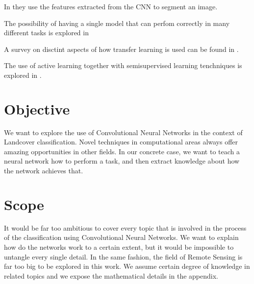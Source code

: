 In \cite{DBLP:journals/corr/LongSD14} they use the features extracted from the CNN to segment an image.

The possibility of having a single model that can perfom correctly in many different tasks is explored in \cite{DBLP:journals/corr/KaiserGSVPJU17}

A survey on disctint aspects of how transfer learning is used can be found in \cite{5288526}.

The use of active learning together with semisupervised learning tenchniques is explored in \cite{7956153}.


\section{Objective}

We want to explore the use of Convolutional Neural Networks in the context of Landcover classification. Novel techniques in computational areas always offer amazing opportunities in other fields. In our concrete case, we want to teach a neural network how to perform a task, and then extract knowledge about how the network achieves that.\\

\section{Scope}

It would be far too ambitious to cover every topic that is involved in the process of the classification using Convolutional Neural Networks. We want to explain how do the networks work to a certain extent, but it would be impossible to untangle every single detail. In the same fashion, the field of Remote Sensing is far too big to be explored in this work. We assume certain degree of knowledge in related topics and we expose the mathematical details in the appendix.\\
